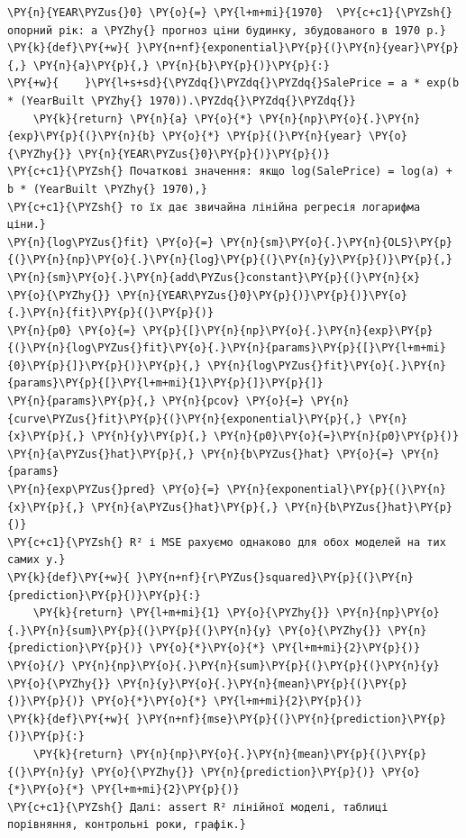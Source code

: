 \begin{Verbatim}[commandchars=\\\{\}]
\PY{n}{YEAR\PYZus{}0} \PY{o}{=} \PY{l+m+mi}{1970}  \PY{c+c1}{\PYZsh{} опорний рік: a \PYZhy{} прогноз ціни будинку, збудованого в 1970 р.}
\PY{k}{def}\PY{+w}{ }\PY{n+nf}{exponential}\PY{p}{(}\PY{n}{year}\PY{p}{,} \PY{n}{a}\PY{p}{,} \PY{n}{b}\PY{p}{)}\PY{p}{:}
\PY{+w}{    }\PY{l+s+sd}{\PYZdq{}\PYZdq{}\PYZdq{}SalePrice = a * exp(b * (YearBuilt \PYZhy{} 1970)).\PYZdq{}\PYZdq{}\PYZdq{}}
    \PY{k}{return} \PY{n}{a} \PY{o}{*} \PY{n}{np}\PY{o}{.}\PY{n}{exp}\PY{p}{(}\PY{n}{b} \PY{o}{*} \PY{p}{(}\PY{n}{year} \PY{o}{\PYZhy{}} \PY{n}{YEAR\PYZus{}0}\PY{p}{)}\PY{p}{)}
\PY{c+c1}{\PYZsh{} Початкові значення: якщо log(SalePrice) = log(a) + b * (YearBuilt \PYZhy{} 1970),}
\PY{c+c1}{\PYZsh{} то їх дає звичайна лінійна регресія логарифма ціни.}
\PY{n}{log\PYZus{}fit} \PY{o}{=} \PY{n}{sm}\PY{o}{.}\PY{n}{OLS}\PY{p}{(}\PY{n}{np}\PY{o}{.}\PY{n}{log}\PY{p}{(}\PY{n}{y}\PY{p}{)}\PY{p}{,} \PY{n}{sm}\PY{o}{.}\PY{n}{add\PYZus{}constant}\PY{p}{(}\PY{n}{x} \PY{o}{\PYZhy{}} \PY{n}{YEAR\PYZus{}0}\PY{p}{)}\PY{p}{)}\PY{o}{.}\PY{n}{fit}\PY{p}{(}\PY{p}{)}
\PY{n}{p0} \PY{o}{=} \PY{p}{[}\PY{n}{np}\PY{o}{.}\PY{n}{exp}\PY{p}{(}\PY{n}{log\PYZus{}fit}\PY{o}{.}\PY{n}{params}\PY{p}{[}\PY{l+m+mi}{0}\PY{p}{]}\PY{p}{)}\PY{p}{,} \PY{n}{log\PYZus{}fit}\PY{o}{.}\PY{n}{params}\PY{p}{[}\PY{l+m+mi}{1}\PY{p}{]}\PY{p}{]}
\PY{n}{params}\PY{p}{,} \PY{n}{pcov} \PY{o}{=} \PY{n}{curve\PYZus{}fit}\PY{p}{(}\PY{n}{exponential}\PY{p}{,} \PY{n}{x}\PY{p}{,} \PY{n}{y}\PY{p}{,} \PY{n}{p0}\PY{o}{=}\PY{n}{p0}\PY{p}{)}
\PY{n}{a\PYZus{}hat}\PY{p}{,} \PY{n}{b\PYZus{}hat} \PY{o}{=} \PY{n}{params}
\PY{n}{exp\PYZus{}pred} \PY{o}{=} \PY{n}{exponential}\PY{p}{(}\PY{n}{x}\PY{p}{,} \PY{n}{a\PYZus{}hat}\PY{p}{,} \PY{n}{b\PYZus{}hat}\PY{p}{)}
\PY{c+c1}{\PYZsh{} R² і MSE рахуємо однаково для обох моделей на тих самих y.}
\PY{k}{def}\PY{+w}{ }\PY{n+nf}{r\PYZus{}squared}\PY{p}{(}\PY{n}{prediction}\PY{p}{)}\PY{p}{:}
    \PY{k}{return} \PY{l+m+mi}{1} \PY{o}{\PYZhy{}} \PY{n}{np}\PY{o}{.}\PY{n}{sum}\PY{p}{(}\PY{p}{(}\PY{n}{y} \PY{o}{\PYZhy{}} \PY{n}{prediction}\PY{p}{)} \PY{o}{*}\PY{o}{*} \PY{l+m+mi}{2}\PY{p}{)} \PY{o}{/} \PY{n}{np}\PY{o}{.}\PY{n}{sum}\PY{p}{(}\PY{p}{(}\PY{n}{y} \PY{o}{\PYZhy{}} \PY{n}{y}\PY{o}{.}\PY{n}{mean}\PY{p}{(}\PY{p}{)}\PY{p}{)} \PY{o}{*}\PY{o}{*} \PY{l+m+mi}{2}\PY{p}{)}
\PY{k}{def}\PY{+w}{ }\PY{n+nf}{mse}\PY{p}{(}\PY{n}{prediction}\PY{p}{)}\PY{p}{:}
    \PY{k}{return} \PY{n}{np}\PY{o}{.}\PY{n}{mean}\PY{p}{(}\PY{p}{(}\PY{n}{y} \PY{o}{\PYZhy{}} \PY{n}{prediction}\PY{p}{)} \PY{o}{*}\PY{o}{*} \PY{l+m+mi}{2}\PY{p}{)}
\PY{c+c1}{\PYZsh{} Далі: assert R² лінійної моделі, таблиці порівняння, контрольні роки, графік.}
\end{Verbatim}
